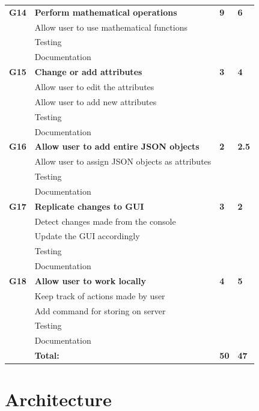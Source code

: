 \begin{table}
\begin{tabular}{ l p{8cm} l l }
\bf{G14}	  &\bf{Perform mathematical operations}			&\bf{9}		&\bf{6}		     \\
		  &Allow user to use mathematical functions		&			&		\\
		  &Testing								&			&		\\
		  &Documentation							&			&		\\

\bf{G15}   	&\bf{Change or add attributes}				&\bf{3}		&\bf{4}		     \\ 
		  &Allow user to edit the attributes				&			&		\\
		  &Allow user to add new attributes				&			&		\\
		  &Testing								&			&		\\
		  &Documentation							&			&		\\

\bf{G16}   	&\bf{Allow user to add entire JSON objects}			&\bf{2}		&\bf{2.5}		     \\ 
		  &Allow user to assign JSON objects as attributes		&			&		\\
		  &Testing									&			&		\\
		  &Documentation								&			&		\\

\bf{G17}   	&\bf{Replicate changes to GUI}				&\bf{3}		&\bf{2}		     \\ 
		  &Detect changes made from the console		&			&		\\
		  &Update the GUI accordingly					&			&		\\
		  &Testing								&			&		\\
		  &Documentation							&			&		\\

\bf{G18}   	&\bf{Allow user to work locally}				&\bf{4}		&\bf{5}		     \\ 
		  &Keep track of actions made by user			&			&		\\
		  &Add command for storing on server			&			&		\\
		  &Testing								&			&		\\
		  &Documentation							&			&		\\

\hline 
		  &\bf{Total:}						&\bf{50}		&\bf{47}		\\
\hline
\end{tabular}
\label{table:sp3backlog}
\end{table}



\section{Architecture}

